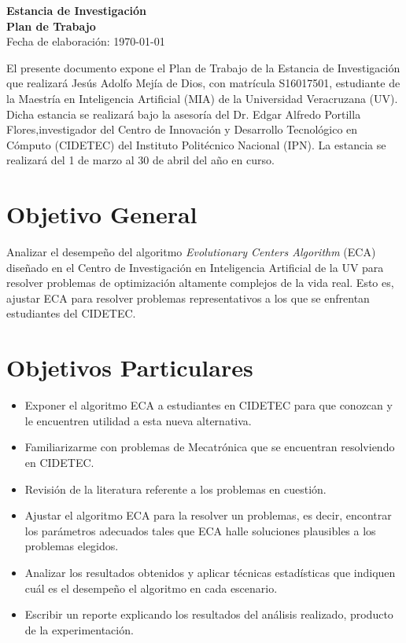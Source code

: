 \documentclass[12pt,letterpaper, xcolor=table, x11names]{article}
\newcommand{\mytitle}{ %
% 
	\vspace*{2cm}
	\begin{center}
		{\LARGE \bf Estancia de Investigación}\\[0.1cm]%
		{\Large \bf Plan de Trabajo}\\[0.4cm]%
		{\large Fecha de elaboración: \today}
	\end{center}
	\vspace{0.7cm}
}
\begin{document}
\mytitle

El presente documento expone el Plan de Trabajo de la Estancia de Investigación
que realizará Jesús Adolfo Mejía de Dios, con matrícula S16017501, estudiante de la
Maestría en Inteligencia Artificial (MIA) de la Universidad Veracruzana (UV). Dicha
estancia se realizará bajo la asesoría del Dr. Edgar Alfredo Portilla
Flores,investigador del Centro de Innovación y Desarrollo Tecnológico en Cómputo (CIDETEC) del Instituto Politécnico Nacional (IPN). La estancia se realizará del 1 de
marzo al 30 de abril del año en curso.

\section{Objetivo General}
Analizar el desempeño del algoritmo \textit{Evolutionary Centers Algorithm} (ECA)
diseñado en el Centro de Investigación en Inteligencia Artificial de la UV para
resolver problemas de optimización altamente complejos de la vida real. Esto es,
ajustar ECA para resolver problemas representativos a los que se enfrentan estudiantes
del CIDETEC.

\section{Objetivos Particulares}
\begin{itemize}
\item Exponer el algoritmo ECA a estudiantes en CIDETEC para que conozcan y le
      encuentren utilidad a esta nueva alternativa.

\item Familiarizarme con problemas de Mecatrónica que se encuentran resolviendo en
      CIDETEC.

\item Revisión de la literatura referente a los problemas en cuestión.

\item Ajustar el algoritmo ECA para la resolver un problemas, es decir, encontrar
      los parámetros adecuados tales que ECA halle soluciones plausibles a los 
      problemas elegidos.

\item Analizar los resultados obtenidos y aplicar técnicas estadísticas que indiquen
      cuál es el desempeño el algoritmo en cada escenario.

\item Escribir un reporte explicando los resultados del análisis realizado, producto de
      la experimentación.
\end{itemize}
\end{document}
